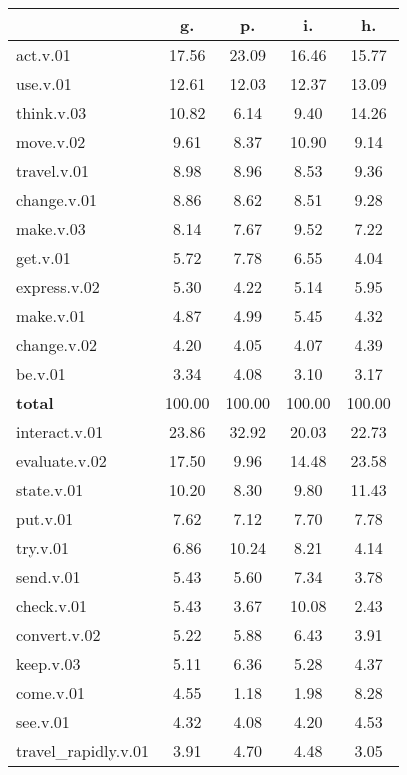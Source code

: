 \begin{table}[h!]
\begin{center}
\begin{tabular}{| l || c | c | c | c |}\hline
 & {\bf g.} & {\bf p.} & {\bf i.} & {\bf h.} \\\hline\hline
act.v.01 & 17.56  & 23.09  & 16.46  & 15.77 \\\hline
use.v.01 & 12.61  & 12.03  & 12.37  & 13.09 \\\hline
think.v.03 & 10.82  & 6.14  & 9.40  & 14.26 \\\hline
move.v.02 & 9.61  & 8.37  & 10.90  & 9.14 \\\hline
travel.v.01 & 8.98  & 8.96  & 8.53  & 9.36 \\\hline
change.v.01 & 8.86  & 8.62  & 8.51  & 9.28 \\\hline
make.v.03 & 8.14  & 7.67  & 9.52  & 7.22 \\\hline
get.v.01 & 5.72  & 7.78  & 6.55  & 4.04 \\\hline
express.v.02 & 5.30  & 4.22  & 5.14  & 5.95 \\\hline
make.v.01 & 4.87  & 4.99  & 5.45  & 4.32 \\\hline
change.v.02 & 4.20  & 4.05  & 4.07  & 4.39 \\\hline
be.v.01 & 3.34  & 4.08  & 3.10  & 3.17 \\\hline\hline
{{\bf total}} & 100.00  & 100.00  & 100.00  & 100.00 \\\hline\hline\hline
interact.v.01 & 23.86  & 32.92  & 20.03  & 22.73 \\\hline
evaluate.v.02 & 17.50  & 9.96  & 14.48  & 23.58 \\\hline
state.v.01 & 10.20  & 8.30  & 9.80  & 11.43 \\\hline
put.v.01 & 7.62  & 7.12  & 7.70  & 7.78 \\\hline
try.v.01 & 6.86  & 10.24  & 8.21  & 4.14 \\\hline
send.v.01 & 5.43  & 5.60  & 7.34  & 3.78 \\\hline
check.v.01 & 5.43  & 3.67  & 10.08  & 2.43 \\\hline
convert.v.02 & 5.22  & 5.88  & 6.43  & 3.91 \\\hline
keep.v.03 & 5.11  & 6.36  & 5.28  & 4.37 \\\hline
come.v.01 & 4.55  & 1.18  & 1.98  & 8.28 \\\hline
see.v.01 & 4.32  & 4.08  & 4.20  & 4.53 \\\hline
travel\_rapidly.v.01 & 3.91  & 4.70  & 4.48  & 3.05 \\\hline\hline

\end{tabular}
\end{center}
\end{table}
